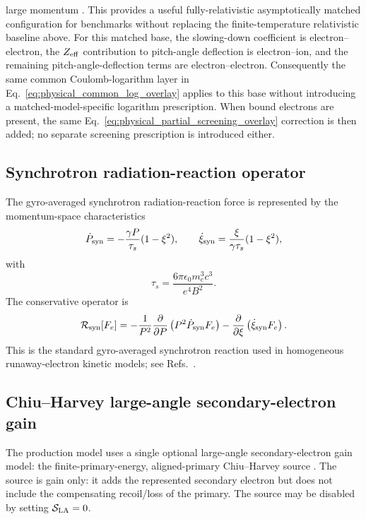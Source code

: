 \documentclass[11pt]{article}
\begin{document}
large momentum \cite{Stahl2016}.  This provides a useful fully-relativistic asymptotically matched configuration for
benchmarks without replacing the finite-temperature relativistic baseline above.  For this matched base, the slowing-down coefficient is electron--electron, the
$Z_{\rm eff}$ contribution to pitch-angle deflection is electron--ion, and the remaining
pitch-angle-deflection terms are electron--electron.  Consequently the same common
Coulomb-logarithm layer in Eq.~\eqref{eq:physical_common_log_overlay} applies to this
base without introducing a matched-model-specific logarithm prescription.  When bound
electrons are present, the same Eq.~\eqref{eq:physical_partial_screening_overlay}
correction is then added; no separate screening prescription is introduced either.

\subsection{Synchrotron radiation-reaction operator}

The gyro-averaged synchrotron radiation-reaction force is represented by the
momentum-space characteristics
\begin{equation}
 \dot P_{\rm syn}
 =-\frac{\gamma P}{\tau_s}(1-\xi^2),
 \qquad
 \dot\xi_{\rm syn}
 =\frac{\xi}{\gamma\tau_s}(1-\xi^2),
 \label{eq:synch_characteristics}
\end{equation}
with
\begin{equation}
 \tau_s=\frac{6\pi\epsilon_0m_e^3c^3}{e^4B^2}.
 \label{eq:synch_time}
\end{equation}
The conservative operator is
\begin{equation}
 \mathcal R_{\rm syn}[F_e]
 =-\frac{1}{P^2}\frac{\partial}{\partial P}
   \left(P^2\dot P_{\rm syn}F_e\right)
  -\frac{\partial}{\partial\xi}
   \left(\dot\xi_{\rm syn}F_e\right).
 \label{eq:synch_operator_dimensional}
\end{equation}
This is the standard gyro-averaged synchrotron reaction used in homogeneous
runaway-electron kinetic models; see Refs.~\cite{Andersson2001,McDevitt2025Dynamics}.

\subsection{Chiu--Harvey large-angle secondary-electron gain}

The production model uses a single optional large-angle secondary-electron gain model:
the finite-primary-energy, aligned-primary Chiu--Harvey source
\cite{Chiu1998,Harvey2000,Arnaud2025}.  The source is gain only: it adds the represented
secondary electron but does not include the compensating recoil/loss of the primary.
The source may be disabled by setting $\mathcal S_{\rm LA}=0$.
\end{document}
